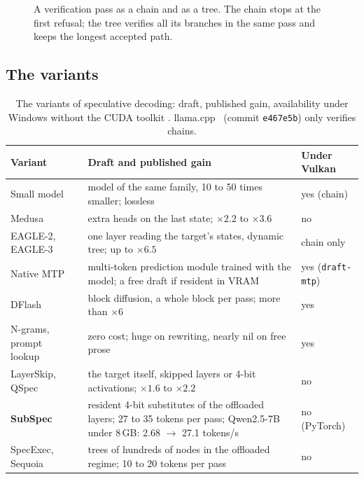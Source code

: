 \begin{figure}[ht]
\centering
\SchemaSpeculation
\caption[Chain and tree verification]{A verification pass as a chain and as a tree. The chain stops at the first refusal; the tree verifies all its branches in the same pass and keeps the longest accepted path.}
\label{fig:speculation}
\end{figure}

\subsection{The variants}

\begin{table}[ht]
\centering\small
\caption[The variants of speculative decoding]{The variants of speculative decoding: draft, published gain, availability under Windows without the CUDA toolkit \litt. llama.cpp~\cite{llamacpp} (commit \texttt{e467e5b}) only verifies chains.}
\label{tab:variantes-spec}
\begin{tabularx}{\linewidth}{@{}lXl@{}}
\toprule
Variant & Draft and published gain & Under Vulkan \\
\midrule
Small model~\cite{leviathan2023,chen2023spec} & model of the same family, 10 to 50 times smaller; lossless & yes (chain) \\
Medusa~\cite{medusa2024} & extra heads on the last state; $\times2.2$ to $\times3.6$ & no \\
EAGLE-2, EAGLE-3~\cite{eagle2_2024,eagle3_2025} & one layer reading the target's states, dynamic tree; up to $\times6.5$ & chain only \\
Native MTP~\cite{gloeckle2024,deepseekv3_2024} & multi-token prediction module trained with the model; a free draft if resident in VRAM & yes (\texttt{draft-mtp}) \\
DFlash~\cite{dflash2026} & block diffusion, a whole block per pass; more than $\times6$ & yes \\
N-grams, prompt lookup~\cite{lookahead2024} & zero cost; huge on rewriting, nearly nil on free prose & yes \\
LayerSkip, QSpec~\cite{layerskip2024,qspec2024} & the target itself, skipped layers or 4-bit activations; $\times1.6$ to $\times2.2$ & no \\
\textbf{SubSpec}~\cite{subspec2025} & resident 4-bit substitutes of the offloaded layers; 27 to 35 tokens per pass; Qwen2.5-7B under 8\,GB: 2.68 $\to$ 27.1 tokens/s & no (PyTorch) \\
SpecExec, Sequoia~\cite{specexec2024,sequoia2024} & trees of hundreds of nodes in the offloaded regime; 10 to 20 tokens per pass & no \\
\bottomrule
\end{tabularx}
\end{table}

